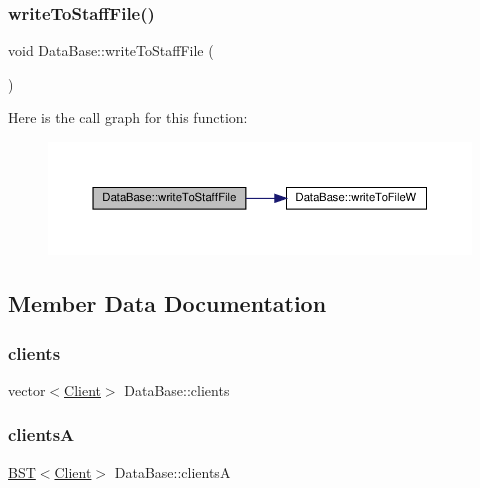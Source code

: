 \subsubsection{\texorpdfstring{write\+To\+Staff\+File()}{writeToStaffFile()}}
{\footnotesize\ttfamily void Data\+Base\+::write\+To\+Staff\+File (\begin{DoxyParamCaption}{ }\end{DoxyParamCaption})}

Here is the call graph for this function\+:\nopagebreak
\begin{figure}[H]
\begin{center}
\leavevmode
\includegraphics[width=350pt]{classDataBase_abc8c8d3116c6b3422d87ae781ba91538_cgraph}
\end{center}
\end{figure}


\subsection{Member Data Documentation}
\mbox{\label{classDataBase_aa5f93e5229c216c200681b551db2db77}} 
\subsubsection{\texorpdfstring{clients}{clients}}
{\footnotesize\ttfamily vector$<$\hyperlink{classClient}{Client}$>$ Data\+Base\+::clients\hspace{0.3cm}{\ttfamily [private]}}

\mbox{\label{classDataBase_a9b3973c4282ee24f7769f4f735b4b898}} 
\subsubsection{\texorpdfstring{clientsA}{clientsA}}
{\footnotesize\ttfamily \hyperlink{classBST}{B\+ST}$<$\hyperlink{classClient}{Client}$>$ Data\+Base\+::clientsA\hspace{0.3cm}{\ttfamily [private]}}



